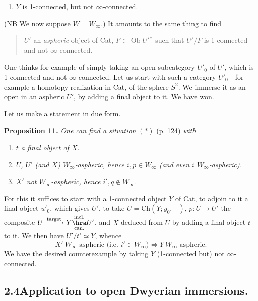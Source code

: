 \begin{enumerate}[label=\alph*), start=3]
\item {}
$Y$ is 1-connected, but not $\infty$-connected.
\end{enumerate}

(NB We now suppose $W=W_\infty$.) It amounts to the same thing to find

\begin{quote}
$U'$ an \textit{aspheric} object of Cat, $F\in\operatorname{Ob}U'^\wedge$ such that $U'/F$ is 1-connected and not $\infty$-connected.
\end{quote}

One thinks for example of simply taking an open subcategory $U'_0$ of $U'$, which is 1-connected and not $\infty$-connected. Let us start with such a category $U'_0$ - for example a homotopy realization in Cat, of the sphere $S^2$. We immerse it as an open in an aspheric $U'$, by adding a final object to it. We have won.


Let us make a statement in due form.

\textbf{Proposition 11.} \textit{One can find a situation} $(*)$ (p. 124) \textit{with}

\begin{enumerate}[label=\textit{\alph*)}]
\item \textit{$t$ a final object of $X$.}
\item \textit{$U$, $U'$ (and $X$) $W_\infty$-aspheric, hence $i,p\in W_\infty$ (and even $i$ $W_\infty$-aspheric).}
\item \textit{$X'$ not $W_\infty$-aspheric, hence $i',q\notin W_\infty$.}
\end{enumerate}

For this it suffices to start with a 1-connected object $Y$ of Cat, to adjoin to it a final object $u'_0$, which gives $U'$, to take $U=\underline{\mathrm{Ch}}(Y;y_0,-)$, $p:U\longrightarrow U'$ the composite $U\xrightarrow{\text{target}}Y\underset{\text{can.}}{\overset{\text{incl.}}{\hra}}U'$, and $X$ deduced from $U$ by adding a final object $t$ to it. We then have $U'/t'\simeq Y$, whence
\[ X'\ W_\infty\text{-aspheric (i.e. }i'\in W_\infty)\Longleftrightarrow Y\ W_\infty\text{-aspheric.} \]
We have the desired counterexample by taking $Y$ (1-connected but) not $\infty$-connected.

\subsection*{2.4\quad Application to open Dwyerian immersions.}

